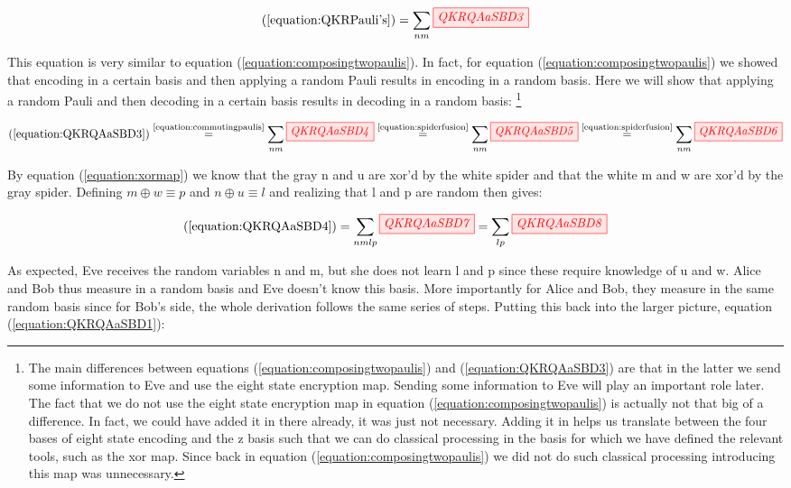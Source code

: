 \documentclass[]{article}
\newcommand{\equaltext}[1]{\ensuremath{\stackrel{\text{#1}}{=}}}
\begin{document}
\begin{equation}
	\label{equation:QKRQAaSBD3}
	(\ref{equation:QKRPauli's}) = \sum\limits_{nm}\tikzfig{QKRQAaSBD3}
\end{equation}

This equation is very similar to equation (\ref{equation:composingtwopaulis}). In fact, for equation (\ref{equation:composingtwopaulis}) we showed that encoding in a certain basis and then applying a random Pauli results in encoding in a random basis. Here we will show that applying a random Pauli and then decoding in a certain basis results in decoding in a random basis: \footnote{The main differences between equations (\ref{equation:composingtwopaulis}) and (\ref{equation:QKRQAaSBD3}) are that in the latter we send some information to Eve and use the eight state encryption map. Sending some information to Eve will play an important role later. The fact that we do not use the eight state encryption map in equation (\ref{equation:composingtwopaulis}) is actually not that big of a difference. In fact, we could have added it in there already, it was just not necessary. Adding it in helps us translate between the four bases of eight state encoding and the z basis such that we can do classical processing in the basis for which we have defined the relevant tools, such as the xor map. Since back in equation (\ref{equation:composingtwopaulis}) we did not do such classical processing introducing this map was unnecessary.} 

\begin{equation}
\label{equation:QKRQAaSBD4}
(\ref{equation:QKRQAaSBD3}) \equaltext{\ref{equation:commutingpaulis}} \sum\limits_{nm}\tikzfig{QKRQAaSBD4} \equaltext{\ref{equation:spiderfusion}} \sum\limits_{nm}\tikzfig{QKRQAaSBD5} \equaltext{\ref{equation:spiderfusion}} \sum\limits_{nm}\tikzfig{QKRQAaSBD6} 
\end{equation}

By equation (\ref{equation:xormap}) we know that the gray n and u are xor'd by the white spider and that the white m and w are xor'd by the gray spider. Defining $m \oplus w \equiv p$ and $n \oplus u \equiv l$ and realizing that l and p are random then gives: 

\begin{equation}
	\label{equation:randompaulidecoding}
	(\ref{equation:QKRQAaSBD4}) = 
	\sum\limits_{nmlp}\tikzfig{QKRQAaSBD7} = \sum\limits_{lp}\tikzfig{QKRQAaSBD8}
\end{equation}

As expected, Eve receives the random variables n and m, but she does not learn l and p since these require knowledge of u and w. Alice and Bob thus measure in a random basis and Eve doesn't know this basis. More importantly for Alice and Bob, they measure in the same random basis since for Bob's side, the whole derivation follows the same series of steps. Putting this back into the larger picture, equation (\ref{equation:QKRQAaSBD1}):
\end{document}
